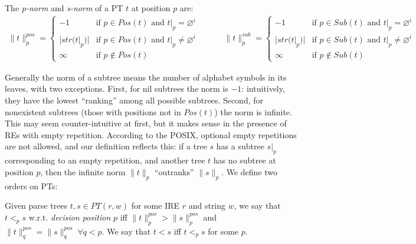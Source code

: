 \documentclass[AMA,STIX1COL]{WileyNJD-v2}
\newcommand{\pnorm}[2]{\|{#1}\|^{pos}_{#2}}
\newcommand{\snorm}[2]{\|{#1}\|^{sub}_{#2}}
\begin{document}
    \begin{definition}\label{tnorm_of_PTs}
    The \emph{p-norm} and \emph{s-norm} of a PT $t$ at position $p$ are:
    \begin{align*}
        \pnorm{t}{p} =
            \begin{cases}
                -1          &\text{if } p \in Pos(t) \text{ and } t|_p = \varnothing^i  \\[-0.2em]
                |str(t|_p)| &\text{if } p \in Pos(t) \text{ and } t|_p \neq \varnothing^i \\[-0.2em]
                \infty      &\text{if } p \not\in Pos(t)
            \end{cases}
    \quad\quad\quad
        \snorm{t}{p} =
            \begin{cases}
                -1          &\text{if } p \in Sub(t) \text{ and } t|_p = \varnothing^i  \\[-0.2em]
                |str(t|_p)| &\text{if } p \in Sub(t) \text{ and } t|_p \neq \varnothing^i \\[-0.2em]
                \infty      &\text{if } p \not\in Sub(t)
            \end{cases}
    \end{align*}
    \end{definition}

Generally the norm of a subtree means the number of alphabet symbols in its leaves, with two exceptions.
First, for nil subtrees the norm is $-1$: intuitively, they have the lowest ``ranking'' among all possible subtrees.
Second, for nonexistent subtrees (those with positions not in $Pos(t)$) the norm is infinite.
This may seem counter-intuitive at first, but it makes sense in the presence of REs with empty repetition.
According to the POSIX, optional empty repetitions are not allowed, and our definition reflects this:
if a tree $s$ has a subtree $s|_p$ corresponding to an empty repetition,
and another tree $t$ has no subtree at position $p$,
then the infinite norm $\|t\|_p$ ``outranks'' $\|s\|_p$.
We define two orders on PTs:

    \begin{definition}
    \label{total_order_on_PTs}
    Given parse trees $t, s \in PT(r, w)$ for some IRE $r$ and string $w$, we say that $t <_p s$ w.r.t. \emph{decision position} $p$
    iff $\pnorm{t}{p} > \pnorm{s}{p}$ and $\pnorm{t}{q} = \pnorm{s}{q} \; \forall q < p$.
    We say that $t < s$ iff $t <_p s$ for some $p$.
    \end{definition}
\end{document}
